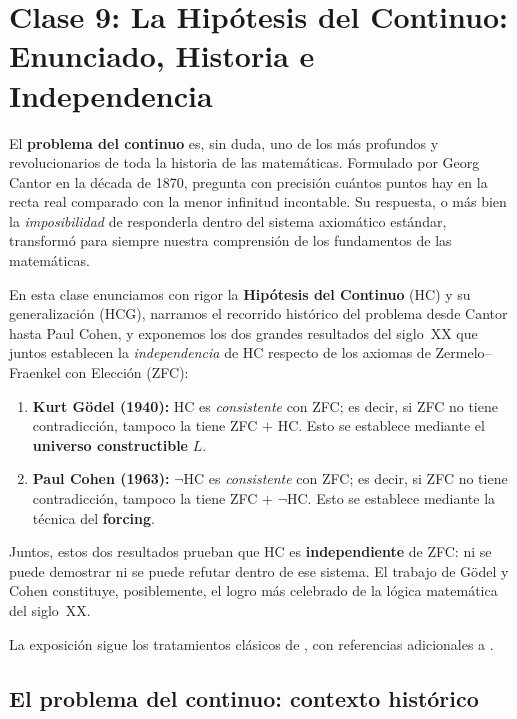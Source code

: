 \chapter{Clase 9: La Hipótesis del Continuo: Enunciado, Historia e Independencia}

El \textbf{problema del continuo} es, sin duda, uno de los más profundos y revolucionarios de toda la historia de las matemáticas. Formulado por Georg Cantor en la década de 1870, pregunta con precisión cuántos puntos hay en la recta real comparado con la menor infinitud incontable. Su respuesta, o más bien la \emph{imposibilidad} de responderla dentro del sistema axiomático estándar, transformó para siempre nuestra comprensión de los fundamentos de las matemáticas.

En esta clase enunciamos con rigor la \textbf{Hipótesis del Continuo} (HC) y su generalización (HCG), narramos el recorrido histórico del problema desde Cantor hasta Paul Cohen, y exponemos los dos grandes resultados del siglo~XX que juntos establecen la \emph{independencia} de HC respecto de los axiomas de Zermelo--Fraenkel con Elección (ZFC):

\begin{enumerate}[leftmargin=2em, label=\textbf{\arabic*.}]
  \item \textbf{Kurt Gödel (1940):} HC es \emph{consistente} con ZFC; es decir, si ZFC no tiene contradicción, tampoco la tiene ZFC $+$ HC. Esto se establece mediante el \textbf{universo constructible} $L$.
  \item \textbf{Paul Cohen (1963):} $\neg$HC es \emph{consistente} con ZFC; es decir, si ZFC no tiene contradicción, tampoco la tiene ZFC $+$ $\neg$HC. Esto se establece mediante la técnica del \textbf{forcing}.
\end{enumerate}

Juntos, estos dos resultados prueban que HC es \textbf{independiente} de ZFC: ni se puede demostrar ni se puede refutar dentro de ese sistema. El trabajo de Gödel y Cohen constituye, posiblemente, el logro más celebrado de la lógica matemática del siglo~XX.

La exposición sigue los tratamientos clásicos de \cite{jech2003, kunen2011, cohen1966, godel1940}, con referencias adicionales a \cite{enderton1977, devlin1993, hrbacek1999}.

\section{El problema del continuo: contexto histórico}

